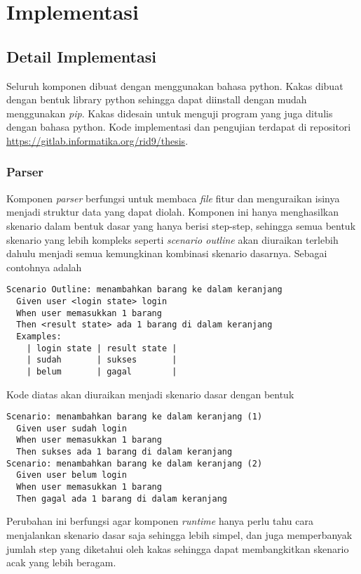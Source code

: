 \chapter{Implementasi}

\section{Detail Implementasi}

Seluruh komponen dibuat dengan menggunakan bahasa python. Kakas dibuat dengan bentuk library python
sehingga dapat diinstall dengan mudah menggunakan \emph{pip}. Kakas didesain untuk menguji
program yang juga ditulis dengan bahasa python. Kode implementasi dan pengujian terdapat
di repositori \url{https://gitlab.informatika.org/rid9/thesis}.

\subsection{Parser}

Komponen \emph{parser} berfungsi untuk membaca \emph{file} fitur dan menguraikan isinya menjadi
struktur data yang dapat diolah. Komponen ini hanya menghasilkan skenario dalam bentuk dasar
yang hanya berisi step-step, sehingga semua bentuk skenario yang lebih kompleks
seperti \emph{scenario outline} akan diuraikan terlebih dahulu menjadi semua kemungkinan
kombinasi skenario dasarnya. Sebagai contohnya adalah

\begin{lstlisting}[language=gherkin]
Scenario Outline: menambahkan barang ke dalam keranjang
  Given user <login state> login
  When user memasukkan 1 barang
  Then <result state> ada 1 barang di dalam keranjang
  Examples:
    | login state | result state |
    | sudah       | sukses       |
    | belum       | gagal        |
\end{lstlisting}

Kode diatas akan diuraikan menjadi skenario dasar dengan bentuk

\begin{lstlisting}[language=gherkin]
Scenario: menambahkan barang ke dalam keranjang (1)
  Given user sudah login
  When user memasukkan 1 barang
  Then sukses ada 1 barang di dalam keranjang
Scenario: menambahkan barang ke dalam keranjang (2)
  Given user belum login
  When user memasukkan 1 barang
  Then gagal ada 1 barang di dalam keranjang
\end{lstlisting}

Perubahan ini berfungsi agar komponen \emph{runtime} hanya perlu tahu cara menjalankan
skenario dasar saja sehingga lebih simpel, dan juga memperbanyak jumlah step yang diketahui
oleh kakas sehingga dapat membangkitkan skenario acak yang lebih beragam.

